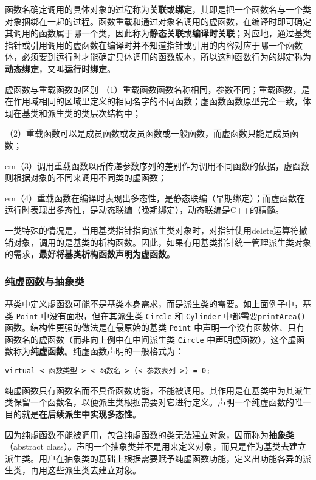 \documentclass[10pt, a4paper, oneside, fontset=none]{ctexart}
\theoremstyle{plain}
\theoremstyle{definition}
\newcommand{\hang}[1][1]{\hangafter 1 \hangindent #1em}
\newcommand{\zhu}[2][]{\begin{note}{#1}\xiu #2\end{note}}
\newcommand{\tboba}[1]{\textbf{\kai\color{bali!75!black}#1}}
\begin{document}
函数名确定调用的具体对象的过程称为\tboba{关联}或\tboba{绑定}，其即是把一个函数名与一个类对象捆绑在一起的过程。函数重载和通过对象名调用的虚函数，在编译时即可确定其调用的函数属于哪一个类，因此称为\tboba{静态关联}或\tboba{编译时关联}；对应地，通过基类指针或引用调用的虚函数在编译时并不知道指针或引用的内容对应于哪一个函数体，必须要到运行时才能确定具体调用的函数版本，所以这种函数行为的绑定称为\tboba{动态绑定}，又叫\tboba{运行时绑定}。

\zhu[虚函数与重载函数的区别]{
	（1）重载函数函数名称相同，参数不同；重载函数，是在作用域相同的区域里定义的相同名字的不同函数；虚函数函数原型完全一致，体现在基类和派生类的类层次结构中；

	（2）重载函数可以是成员函数或友员函数或一般函数，而虚函数只能是成员函数；

	\hang[2]（3）调用重载函数以所传递参数序列的差别作为调用不同函数的依据，虚函数则根据对象的不同来调用不同类的虚函数；

	\hang[2]（4）重载函数在编译时表现出多态性，是静态联编（早期绑定）；而虚函数在运行时表现出多态性，是动态联编（晚期绑定），动态联编是C++的精髓。
}

一类特殊的情况是，当用基类指针指向派生类对象时，对指针使用delete运算符撤销对象，调用的是基类的析构函数。因此，如果有用基类指针统一管理派生类对象的需求，\textbf{最好将基类析构函数声明为虚函数}。

\subsubsection{纯虚函数与抽象类}

基类中定义虚函数可能不是基类本身需求，而是派生类的需要。如上面例子中，基类 \texttt{Point} 中没有面积，但在其派生类 \texttt{Circle} 和 \texttt{Cylinder} 中都需要\texttt{printArea()}函数。结构性更强的做法是在最原始的基类 \texttt{Point} 中声明一个没有函数体、只有函数名的虚函数（而非向上例中在中间派生类 \texttt{Circle} 中声明虚函数），这个虚函数称为\tboba{纯虚函数}。纯虚函数声明的一般格式为：
\begin{lstlisting}[style=intro]
	virtual <-函数类型-> <-函数名-> (<-参数表列->) = 0;
\end{lstlisting}

纯虚函数只有函数名而不具备函数功能，不能被调用。其作用是在基类中为其派生类保留一个函数名，以便派生类根据需要对它进行定义。声明一个纯虚函数的唯一目的就是\textbf{在后续派生中实现多态性}。

因为纯虚函数不能被调用，包含纯虚函数的类无法建立对象，因而称为\tboba{抽象类}（abstract class）。声明一个抽象类并不是用来定义对象，而只是作为基类去建立派生类。用户在抽象类的基础上根据需要赋予纯虚函数功能，定义出功能各异的派生类，再用这些派生类去建立对象。
\end{document}
